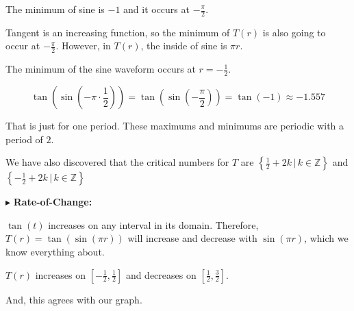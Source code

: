 \documentclass{ximera}
\begin{document}
The minimum of sine is $-1$ and it occurs at $-\frac{\pi}{2}$.

Tangent is an increasing function, so the minimum of $T(r)$ is also going to occur at $-\frac{\pi}{2}$. However, in $T(r)$, the inside of sine is $\pi r$.


The minimum of the sine waveform occurs at $r = -\frac{1}{2}$.


\[   \tan\left(\sin\left(-\pi \cdot \frac{1}{2}\right)\right)  =   \tan\left(\sin\left(-\frac{\pi}{2}\right)\right)  = \tan(-1)  \approx -1.557  \]




That is just for one period. These maximums and minimums are periodic with a period of $2$.







We have also discovered that the critical numbers for $T$ are $\left\{ \frac{1}{2} + 2k \, | \, k \in \mathbb{Z} \right\}$ and $\left\{ -\frac{1}{2} + 2k \, | \, k \in \mathbb{Z} \right\}$










$\blacktriangleright$ \textbf{\textcolor{blue!55!black}{Rate-of-Change: }} 


$\tan(t)$ increases on any interval in its domain.  Therefore, $T(r) = \tan(\sin(\pi r))$ will increase and decrease with $\sin(\pi r)$, which we know everything about.




$T(r)$ increases on $\left[ -\frac{1}{2}, \frac{1}{2} \right]$ and decreases on $\left[\frac{1}{2}, \frac{3}{2} \right]$.



And, this agrees with our graph.
\end{document}
